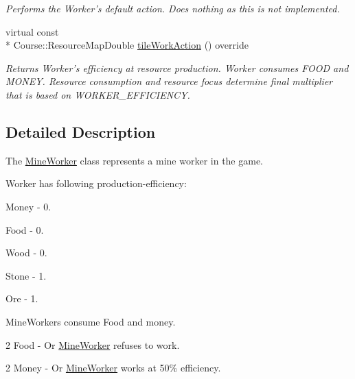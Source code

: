 \begin{DoxyCompactItemize}
\begin{DoxyCompactList}\small\item\em Performs the Worker's default action. Does nothing as this is not implemented. \end{DoxyCompactList}\item 
virtual const \\*
Course\-::\-Resource\-Map\-Double \hyperlink{classMineWorker_a75713bed7c7f8ae8a9518b922a192db5}{tile\-Work\-Action} () override
\begin{DoxyCompactList}\small\item\em Returns Worker's efficiency at resource production. Worker consumes F\-O\-O\-D and M\-O\-N\-E\-Y. Resource consumption and resource focus determine final multiplier that is based on W\-O\-R\-K\-E\-R\-\_\-\-E\-F\-F\-I\-C\-I\-E\-N\-C\-Y. \end{DoxyCompactList}\end{DoxyCompactItemize}


\subsection{Detailed Description}
The \hyperlink{classMineWorker}{Mine\-Worker} class represents a mine worker in the game. 

Worker has following production-\/efficiency\-: \par

\begin{DoxyItemize}
\item Money -\/ 0. \par

\item Food -\/ 0. \par

\item Wood -\/ 0. \par

\item Stone -\/ 1. \par

\item Ore -\/ 1. \par
 Mine\-Workers consume Food and money. \par

\item 2 Food -\/ Or \hyperlink{classMineWorker}{Mine\-Worker} refuses to work. \par

\item 2 Money -\/ Or \hyperlink{classMineWorker}{Mine\-Worker} works at 50\% efficiency. 
\end{DoxyItemize}


